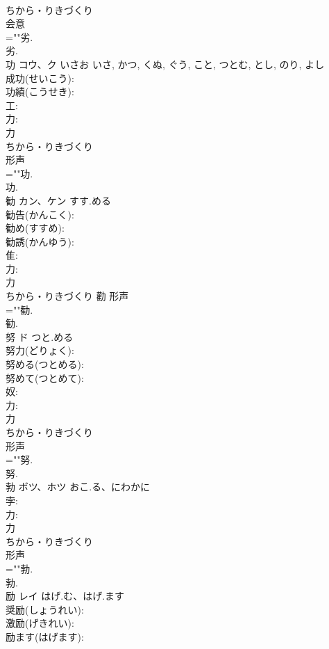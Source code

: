 \documentclass[8pt]{extreport}
\begin{document}
\begin{CJK}{UTF8}{min}
\\	ちから・りきづくり	
\\	会意 
\\	=""劣.
\\	劣.
\\	功	コウ、ク	いさお	いさ, かつ, くぬ, ぐう, こと, つとむ, とし, のり, よし	
\\	成功(せいこう): 
\\	功績(こうせき): 
\\	工: 
\\	力: 
\\	力	
\\	ちから・りきづくり	
\\	形声 
\\	=""功.
\\	功.
\\	勧	カン、ケン	すす.める		
\\	勧告(かんこく): 
\\	勧め(すすめ): 
\\	勧誘(かんゆう): 
\\	隹: 
\\	力: 
\\	力	
\\	ちから・りきづくり	勸	形声 
\\	=""勧.
\\	勧.
\\	努	ド	つと.める		
\\	努力(どりょく): 
\\	努める(つとめる): 
\\	努めて(つとめて): 
\\	奴: 
\\	力: 
\\	力	
\\	ちから・りきづくり	
\\	形声 
\\	=""努.
\\	努.
\\	勃	ボツ、ホツ	おこ.る、にわかに		
\\	孛: 
\\	力: 
\\	力	
\\	ちから・りきづくり	
\\	形声 
\\	=""勃.
\\	勃.
\\	励	レイ	はげ.む、はげ.ます		
\\	奨励(しょうれい): 
\\	激励(げきれい): 
\\	励ます(はげます): 

\end{CJK}
\end{document}
